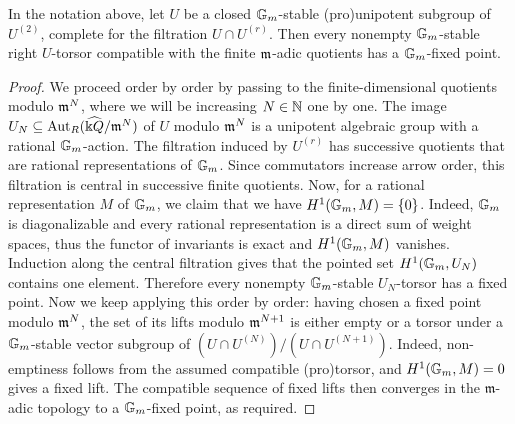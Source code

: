 \begin{lemma}\label{lem:torsor} In the notation above, let $U$ be a closed $\mathbb{G}_{m}$-stable (pro)unipotent subgroup of $U^{(2)}$, complete for the filtration $U\cap U^{(r)}$. Then every nonempty $\mathbb{G}_{m}$-stable right $U$-torsor compatible with the finite $\mathfrak m$-adic quotients has a $\mathbb{G}_{m}$-fixed point.
\end{lemma}

\begin{proof} We proceed order by order by passing to the finite-dimensional quotients modulo $\mathfrak m^N$, where we will be increasing $N\in\mathbb N$ one by one. The image $U_N\subseteq\operatorname{Aut}_R(\widehat{\Bbbk Q}/\mathfrak{m}^N)$ of $U$ modulo $\mathfrak m^N$ is a unipotent algebraic group with a rational $\mathbb{G}_{m}$-action. The filtration induced by $U^{(r)}$ has successive quotients that are rational representations of $\mathbb{G}_{m}$. Since commutators increase arrow order, this filtration is central in successive finite quotients. Now, for a rational representation $M$ of $\mathbb{G}_{m}$, we claim that we have $H^1(\mathbb{G}_{m},M)=\{0\}$. Indeed, $\mathbb{G}_{m}$ is diagonalizable and every rational representation is a direct sum of weight spaces, thus the functor of invariants is exact and $H^1(\mathbb{G}_{m},M)$ vanishes.  Induction along the central filtration gives that the pointed set $H^1(\mathbb{G}_{m},U_N)$ contains one element. Therefore every nonempty $\mathbb{G}_{m}$-stable $U_N$-torsor has a fixed point. Now we keep applying this order by order: having chosen a fixed point modulo $\mathfrak m^N$, the set of its lifts modulo $\mathfrak m^{N+1}$ is either empty or a torsor under a $\mathbb{G}_{m}$-stable vector subgroup of $(U\cap U^{(N)})/(U\cap U^{(N+1)})$. Indeed, non-emptiness follows from the assumed compatible (pro)torsor, and $H^1(\mathbb{G}_{m},M)=0$ gives a fixed lift.  The compatible sequence of fixed lifts then converges in the $\mathfrak{m}$-adic topology to a $\mathbb{G}_{m}$-fixed point, as required.
\end{proof}

